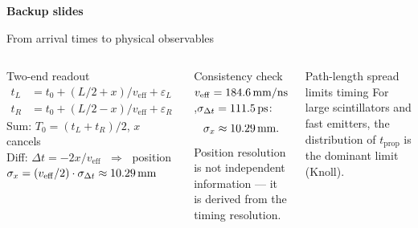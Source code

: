 \documentclass[aspectratio=169,9pt]{beamer}
\newcommand{\veff}{v_{\mathrm{eff}}}
\begin{document}
\begin{frame}[plain]
  \vspace{2.5cm}
  \begin{center}
    {\Large\bfseries Backup slides}
  \end{center}
\end{frame}

\begin{frame}{From arrival times to physical observables}
  \begin{columns}[T]
      \begin{block}{Two-end readout}
        \begin{align*}
          t_L &= t_0 + (L/2+x)/\veff + \varepsilon_L\\
          t_R &= t_0 + (L/2-x)/\veff + \varepsilon_R
        \end{align*}
        Sum: $T_0=(t_L+t_R)/2$, $x$ cancels\\
        Diff: $\Delta t = -2x/\veff$ $\;\Rightarrow\;$ position\\[4pt]
        $\sigma_x = (\veff/2)\cdot\sigma_{\Delta t} \approx \Napsigmaxendmm$
      \end{block}
      \begin{block}{Consistency check}
        {\small $\veff=\Napveffendmmns$,\;$\sigma_{\Delta t}=111.5\,\text{ps}$:
        \[\sigma_x\approx10.29\,\text{mm}.\]
        Position resolution is not independent information —
        it is derived from the timing resolution.}
      \end{block}
      \begin{alertblock}{Path-length spread limits timing}
        {\small For large scintillators and fast emitters, the distribution
        of $t_{\mathrm{prop}}$ is the dominant limit (Knoll).}
      \end{alertblock}
  \end{columns}
\end{frame}
\end{document}
